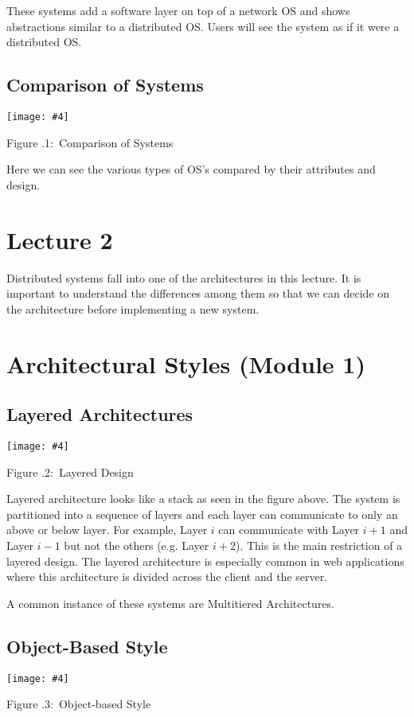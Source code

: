 \documentclass[twoside]{article}
\newcounter{lecnum}
\newcommand{\fig}[4]{
            \centerline{\texttt{[image: \#4]}}
            \begin{center}
            Figure \thelecnum.#1:~#3
            \end{center}
    }
\begin{document}
These systems add a software layer on top of a network OS and shows abstractions similar to a distributed OS. Users will see the system as if it were a distributed OS.


\subsection{Comparison of Systems}
\fig{1}{.3}{Comparison of Systems}{comparison.png}

Here we can see the various types of OS's compared by their attributes and design.







\section{Lecture 2}
Distributed systems fall into one of the architectures in this lecture.  It is important to understand the differences among them so that we can decide on the architecture before implementing a new system.








\section{Architectural Styles (Module 1)}


\subsection{Layered Architectures}

\fig{2}{0.5}{Layered Design}{layered.png}

Layered architecture looks like a stack as seen in the figure above.  The system is partitioned into a sequence of layers and each layer can communicate to only an above or below layer. For example, Layer $i$ can communicate with Layer $i+1$ and Layer $i-1$ but not the others (e.g. Layer $i+2$). This is the main restriction of a layered design. The layered architecture is especially common in web applications where this architecture is divided across the client and the server.

A common instance of these systems are Multitiered Architectures.\\


\subsection{Object-Based Style}
\fig{3}{0.4}{Object-based Style}{object.png}
\end{document}
